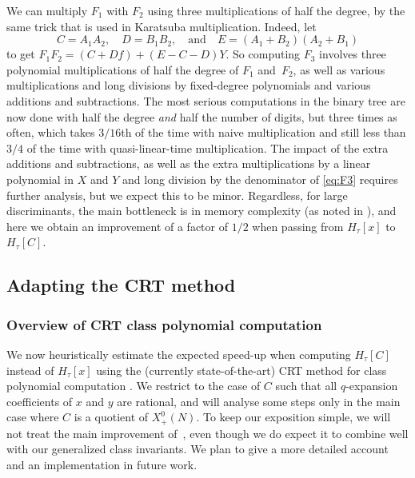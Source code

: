 \documentclass{amsart}
\newcommand{\F}{H_\tau[\curve]}
\newcommand{\Fx}{H_\tau[x]}
\newcommand{\HC}{H_\tau[\curve]}
\newcommand{\Hx}{H_\tau[x]}
\newcommand{\xplus}[1]{X^0_+(#1)}
\newcommand{\xplusN}{\xplus{N}}
\newcommand{\curve}{C}
\numberwithin{equation}{section}
\theoremstyle{definition}
\begin{document}
    We can multiply $F_1$ with $F_2$ using three multiplications
    of half the degree, by the same trick that is used
    in Karatsuba multiplication.
    Indeed, let 
 $$ C = A_1A_2,\quad D = B_1B_2,\quad \mbox{and}\quad
 E=(A_1+B_2)(A_2+B_1)$$
 to get $F_1F_2 = (C+Df) + (E-C-D)Y$.
     So computing $F_3$
    involves three polynomial multiplications
    of half the degree of $F_1$ and~$F_2$,
    as well as various multiplications and long divisions
by fixed-degree polynomials and various additions
and subtractions.
The most serious computations in the binary tree are now
done with half the degree \emph{and} half the number of digits,
but three times as often, which takes $3/16$th of the time
with naive multiplication and still less than $3/4$ of the time with
quasi-linear-time multiplication. The impact of the extra additions and subtractions, as well as the extra multiplications by a linear polynomial in $X$ and $Y$ and long division by the denominator of \eqref{eq:F3} requires further analysis, but we expect this to be minor. Regardless, for large discriminants, the main bottleneck is in memory complexity (as noted in \cite[Section~7]{enge2009complexity}), and here we obtain an improvement of a factor of $1/2$ when passing from $\Hx$ to~$\HC$.
    
    \subsection{Adapting the CRT method}
    

    \subsubsection{Overview of CRT class polynomial computation}

    
    We now heuristically estimate the expected speed-up
    when computing $\F$ instead of $\Fx$ using the
    (currently state-of-the-art) CRT method for class
    polynomial computation \cite{enge-sutherland2010,sutherland2011crt,sutherland2012crt}.
    We restrict to the case of $C$ such that all $q$-expansion coefficients
    of $x$ and $y$ are rational, and will analyse some steps
    only in the main case where $C$ is a quotient of $\xplusN$.
    To keep our exposition simple, we will not treat the main improvement of~\cite{sutherland2012crt},
    even though we do expect it to combine well with our generalized class invariants.
    We plan to give a more detailed account and an implementation
in future work.
    
\end{document}
